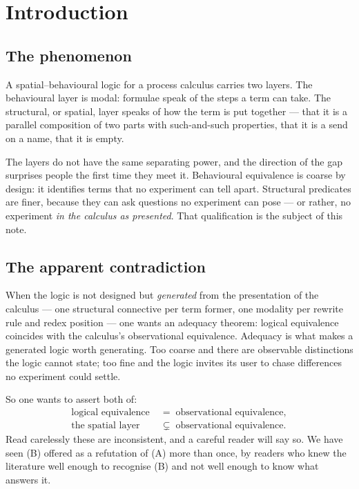 \documentclass[11pt]{article}
\theoremstyle{plain}
\theoremstyle{definition}
\begin{document}
\tableofcontents

\section{Introduction}
\label{sec:intro}

\subsection{The phenomenon}

A spatial--behavioural logic for a process calculus carries two layers. The behavioural layer is
modal: formulae speak of the steps a term can take. The structural, or spatial, layer speaks of how the
term is put together --- that it is a parallel composition of two parts with such-and-such properties,
that it is a send on a name, that it is empty.

The layers do not have the same separating power, and the direction of the gap surprises people the
first time they meet it. Behavioural equivalence is coarse by design: it identifies terms that no
experiment can tell apart. Structural predicates are finer, because they can ask questions no
experiment can pose --- or rather, no experiment \emph{in the calculus as presented}. That
qualification is the subject of this note.

\subsection{The apparent contradiction}

When the logic is not designed but \emph{generated} from the presentation of the calculus --- one
structural connective per term former, one modality per rewrite rule and redex position --- one wants
an adequacy theorem: logical equivalence coincides with the calculus's observational equivalence.
Adequacy is what makes a generated logic worth generating. Too coarse and there are observable
distinctions the logic cannot state; too fine and the logic invites its user to chase differences no
experiment could settle.

So one wants to assert both of:
\begin{align}
\text{logical equivalence} \;&=\; \text{observational equivalence}, \tag{A} \\
\text{the spatial layer} \;&\subsetneq\; \text{observational equivalence}. \tag{B}
\end{align}
Read carelessly these are inconsistent, and a careful reader will say so. We have seen (B) offered as
a refutation of (A) more than once, by readers who knew the literature well enough to recognise (B) and
not well enough to know what answers it.
\end{document}

